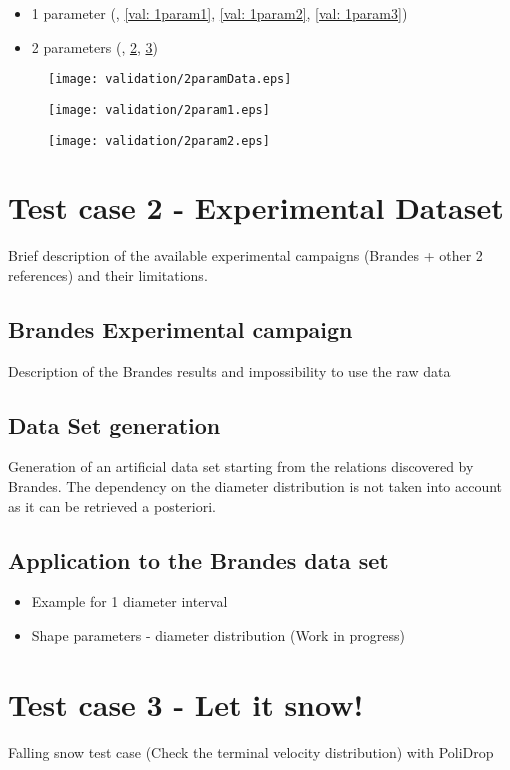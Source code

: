 		
		
		\begin{itemize}
			\item 1 parameter (, \ref{val: 1param1}, \ref{val: 1param2}, \ref{val: 1param3})
			\item 2 parameters (, \ref{val: 2param1}, \ref{val: 2param2})
		\end{itemize}
	
		

		\begin{figure}
			\centering
			\texttt{[image: validation/2paramData.eps]}
			\caption{}
			\label{val: 2paramData}
		\end{figure}
		\begin{figure}
			\centering
			\texttt{[image: validation/2param1.eps]}
			\caption{}
			\label{val: 2param1}
		\end{figure}
		\begin{figure}
			\centering
			\texttt{[image: validation/2param2.eps]}
			\caption{}
			\label{val: 2param2}
		\end{figure}

	\section{Test case 2 - Experimental Dataset}
	\label{sec: TC2}
		Brief description of the available experimental campaigns (Brandes + other 2 references) and their limitations.
	
		\subsection{Brandes Experimental campaign}
		\label{sec: BrandesExp}
		Description of the Brandes results and impossibility to use the raw data
		
		\subsection{Data Set generation}
		\label{sec: dataGeneration}
		Generation of an artificial data set starting from the relations discovered by Brandes. The dependency on the diameter distribution is not taken into account as it can be retrieved a posteriori.
	
		\subsection{Application to the Brandes data set}
		\label{sec: results}
		\begin{itemize}
			\item Example for 1 diameter interval
			\item Shape parameters - diameter distribution (Work in progress)
		\end{itemize}
		
	\section{Test case 3 - Let it snow!}
		Falling snow test case (Check the terminal velocity distribution) with PoliDrop
